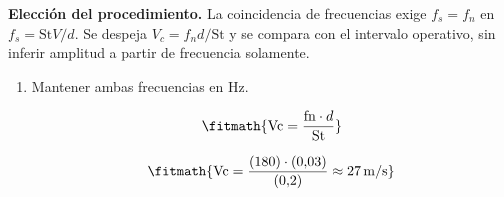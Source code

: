 \noindent\textbf{Elección del procedimiento.} La coincidencia de frecuencias exige $f_s=f_n$ en $f_s=\mathrm{St}V/d$. Se despeja $V_c=f_nd/\mathrm{St}$ y se compara con el intervalo operativo, sin inferir amplitud a partir de frecuencia solamente.

\begin{enumerate}

\item Mantener ambas frecuencias en Hz.

\[\fitmath{\mathrm{Vc}=\frac{\mathrm{fn}\cdot d}{\mathrm{St}}}\]

\[\fitmath{\mathrm{Vc}=\frac{(180)\cdot (0{,}03)}{(0{,}2)}\approx 27\,\mathrm{m/s}}\]

\end{enumerate}
